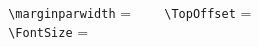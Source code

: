 \documentclass[12pt,english,pdftex,a4paper]{book}
\begin{document}
\ifShowLayout
  \setcounter{chapter}{1}
  \renewcommand*{\FrameEdgeColor}{blue!40}
  \renewcommand*{\ShowSubGridColor}{gray!40}
  \renewcommand*{\ShowGridColor}{gray!70}
  \renewcommand*{\ShowFrameColor}{\color{red!40}}
  \renewcommand*{\ShowGridTextColor}{gray}
  \noindent
  \setvaluestextsize{\footnotesize}
  \footnotesize
  \\
  ~\verb| \marginparwidth| = 
  \prntlen{\marginparwidth}
  ~\verb|   \TopOffset| = 
  \prntlen{\TopOffset}\\
  ~\verb| \FontSize| = \FontSize
  \ifSpaper
  \else
  \fi
  \pagediagram
  \setvaluestextsize{\normalsize}
  \normalsize
\else
  ~
\fi
\end{document}
